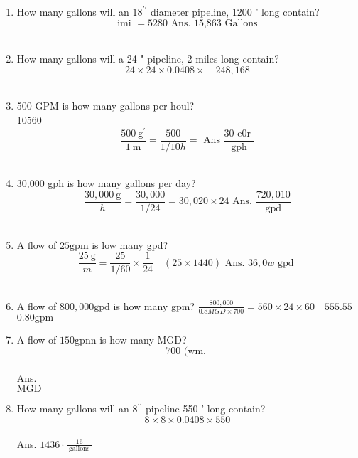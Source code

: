 \begin{enumerate}
\item How many gallons will an $18^{\prime \prime}$ diameter pipeline, 1200 ' long contain?\\
$$\text { imi }=5280 \text { Ans. 15,863 Gallons }$$\\

\item How many gallons will a 24 " pipeline, 2 miles long contain?\\
$$24 \times 24 \times 0.0408 \times \quad 248,168$$\\

\item 500 GPM is how many gallons per houl?\\
10560\\
$$\frac{500 \mathrm{~g}^{\prime}}{1 \mathrm{~m}}=\frac{500}{1 / 10 h}=\text { Ans } \frac{30 \text { e0r }}{\mathrm{gph}}$$\\

\item 30,000 gph is how many gallons per day?\\
$$\frac{30,000 \mathrm{~g}}{h}=\frac{30,000}{1 / 24}=30,020 \times 24 \text { Ans. } \frac{720,010}{\mathrm{gpd}}$$\\
\item A flow of $25 \mathrm{gpm}$ is low many gpd?\\
$$\frac{25 \mathrm{~g}}{m}=\frac{25}{1 / 60} \times \frac{1}{24} \quad(25 \times 1440) \text { Ans. } 36,0 w \text { gpd }$$\\

\item A flow of $800,000 \mathrm{gpd}$ is how many gpm? $\frac{800,000}{0.8 M G D \times 700}=560 \times 24 \times 60 \quad 555.55$\\
$0.80 \mathrm{gpm}$\\

\item A flow of $150 \mathrm{gpnn}$ is how many MGD?\\
$$700 \text { (wm. }$$\\
Ans.\\
$\mathrm{MGD}$\\

\item How many gallons will an $8^{\prime \prime}$ pipeline 550 ' long contain?\\
$$8 \times 8 \times 0.0408 \times 550$$\\
Ans. $1436 \cdot \frac{16}{\text { gallons }}$\\


\end{enumerate}
